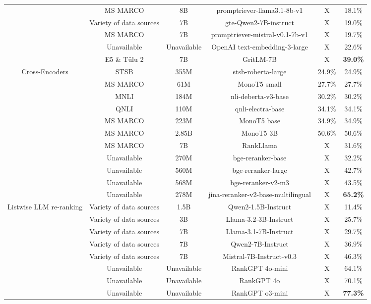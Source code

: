 \begin{table*}[tbp]
\begin{tabular}{cccccc}
    & MS MARCO & 8B\footnotemark & promptriever-llama3.1-8b-v1 \cite{promptriever} & X & 18.1\% \\
    & Variety of data sources \cite{qwen_gte}  & 7B & gte-Qwen2-7B-instruct \cite{qwen_gte} & X & 19.0\% \\
    & MS MARCO & 7B & promptriever-mistral-v0.1-7b-v1 \cite{promptriever} & X & 19.7\% \\
    & Unavailable & Unavailable & OpenAI text-embedding-3-large & X & 22.6\%\\
    & E5 \cite{e5} \& Tülu 2 \cite{tulu2} & 7B & GritLM-7B \cite{gritlm} & X & \textbf{39.0\%} \\
    \midrule
    Cross-Encoders & STSB & 355M & stsb-roberta-large & 24.9\% & 24.9\%\\
    & MS MARCO & 61M & MonoT5 small \cite{nogueira-etal-2020-document} & 27.7\% & 27.7\%\\
    & MNLI & 184M & nli-deberta-v3-base & 30.2\% & 30.2\%\\
    & QNLI & 110M & qnli-electra-base & 34.1\% & 34.1\%\\
    & MS MARCO & 223M & MonoT5 base \cite{nogueira-etal-2020-document} & 34.9\% & 34.9\%\\
    & MS MARCO & 2.85B & MonoT5 3B \cite{nogueira-etal-2020-document} & 50.6\% & 50.6\%\\
    & MS MARCO & 7B & RankLlama \cite{repllama_rankllama} & X & 31.6\% \\
    & Unavailable & 270M & bge-reranker-base & X & 32.2\% \\
    & Unavailable & 560M & bge-reranker-large & X & 42.7\% \\
    & Unavailable & 568M & bge-reranker-v2-m3 \cite{baai_bge_reranker_v2_m3} & X & 43.5\% \\
    & Unavailable & 278M & jina-reranker-v2-base-multilingual & X & \textbf{65.2\%} \\
    \midrule
    Listwise LLM re-ranking & Variety of data sources \cite{qwen_gte} & 1.5B & Qwen2-1.5B-Instruct \cite{qwen_gte} & X & 11.4\% \\
    & Variety of data sources \cite{llama3} & 3B & Llama-3.2-3B-Instruct \cite{llama3} & X & 25.7\% \\
    & Variety of data sources \cite{llama3} & 7B & Llama-3.1-7B-Instruct \cite{llama3} & X & 29.7\% \\
    & Variety of data sources \cite{qwen_gte} & 7B & Qwen2-7B-Instruct \cite{qwen_gte} & X & 36.9\% \\
    & Variety of data sources \cite{mistral7b} & 7B & Mistral-7B-Instruct-v0.3 \cite{mistral7b} & X & 46.3\% \\
    & Unavailable & Unavailable & RankGPT 4o-mini \cite{openai2024gpt4technicalreport} & X & 64.1\% \\
     & Unavailable & Unavailable & RankGPT 4o \cite{openai2024gpt4technicalreport} & X & 70.1\% \\
     & Unavailable & Unavailable & RankGPT o3-mini & X & \textbf{77.3\%} \\
    \bottomrule
  \end{tabular}
\end{table*}

